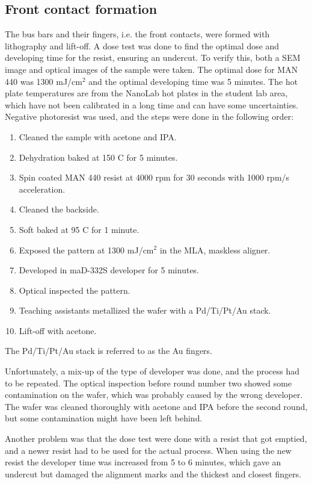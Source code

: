 \subsection{Front contact formation}
\label{methods:front_contact}

The bus bars and their fingers, i.e. the front contacts, were formed with lithography and lift-off.
A dose test was done to find the optimal dose and developing time for the resist, ensuring an undercut.
To verify this, both a SEM image and optical images of the sample were taken.
The optimal dose for MAN 440 was 1300 mJ/cm$^2$ and the optimal developing time was 5 minutes.
The hot plate temperatures are from the NanoLab hot plates in the student lab area, which have not been calibrated in a long time and can have some uncertainties. 
Negative photoresist was used, and the steps were done in the following order:
\begin{enumerate}
    \item Cleaned the sample with acetone and IPA.
    \item Dehydration baked at 150 \textdegree C for 5 minutes.
    \item Spin coated MAN 440 resist at 4000 rpm for 30 seconds with 1000 rpm/s acceleration.
    \item Cleaned the backside.
    \item Soft baked at 95 \textdegree C for 1 minute.
    \item Exposed the pattern at 1300 mJ/cm$^2$ in the MLA, maskless aligner.
    \item Developed in maD-332S developer for 5 minutes.
    \item Optical inspected the pattern.
    \item Teaching assistants metallized the wafer with a Pd/Ti/Pt/Au stack.
    \item Lift-off with acetone.
\end{enumerate}

The Pd/Ti/Pt/Au stack is referred to as the Au fingers. 

Unfortunately, a mix-up of the type of developer was done, and the process had to be repeated. 
The optical inspection before round number two showed some contamination on the wafer, which was probably caused by the wrong developer.
The wafer was cleaned thoroughly with acetone and IPA before the second round, but some contamination might have been left behind.

Another problem was that the dose test were done with a resist that got emptied, and a newer resist had to be used for the actual process.
When using the new resist the developer time was increased from 5 to 6 minutes, which gave an undercut but damaged the alignment marks and the thickest and closest fingers.




